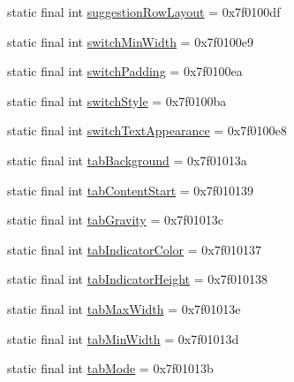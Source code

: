 \begin{CompactItemize}
\item 
static final int \hyperlink{classandroid_1_1support_1_1graphics_1_1drawable_1_1_r_1_1attr_e8e10574116be9e11c358d75ff323616}{suggestionRowLayout} = 0x7f0100df
\item 
static final int \hyperlink{classandroid_1_1support_1_1graphics_1_1drawable_1_1_r_1_1attr_4d688b83a54083a8d9114d1f82b1dbf5}{switchMinWidth} = 0x7f0100e9
\item 
static final int \hyperlink{classandroid_1_1support_1_1graphics_1_1drawable_1_1_r_1_1attr_95b3b0970d23cb3b858bcc2ffb09e4b3}{switchPadding} = 0x7f0100ea
\item 
static final int \hyperlink{classandroid_1_1support_1_1graphics_1_1drawable_1_1_r_1_1attr_26427559541fedf28887bd4ad5db9251}{switchStyle} = 0x7f0100ba
\item 
static final int \hyperlink{classandroid_1_1support_1_1graphics_1_1drawable_1_1_r_1_1attr_3e19347e909fce137f90b900a47db270}{switchTextAppearance} = 0x7f0100e8
\item 
static final int \hyperlink{classandroid_1_1support_1_1graphics_1_1drawable_1_1_r_1_1attr_31dbd3283763b84669acd3cf07072cd7}{tabBackground} = 0x7f01013a
\item 
static final int \hyperlink{classandroid_1_1support_1_1graphics_1_1drawable_1_1_r_1_1attr_2b1dfda823425a2525ccbf51a3cddaa8}{tabContentStart} = 0x7f010139
\item 
static final int \hyperlink{classandroid_1_1support_1_1graphics_1_1drawable_1_1_r_1_1attr_053a2902102ae41a288d60b9afb56ed3}{tabGravity} = 0x7f01013c
\item 
static final int \hyperlink{classandroid_1_1support_1_1graphics_1_1drawable_1_1_r_1_1attr_7a34b35bb03e0fda91267d9c093db679}{tabIndicatorColor} = 0x7f010137
\item 
static final int \hyperlink{classandroid_1_1support_1_1graphics_1_1drawable_1_1_r_1_1attr_34901eedf01bbdb2df0c26af32c8b3f1}{tabIndicatorHeight} = 0x7f010138
\item 
static final int \hyperlink{classandroid_1_1support_1_1graphics_1_1drawable_1_1_r_1_1attr_9dd293e2ce5286f0e0eb6de6151a594e}{tabMaxWidth} = 0x7f01013e
\item 
static final int \hyperlink{classandroid_1_1support_1_1graphics_1_1drawable_1_1_r_1_1attr_1d735bc6773e8f6fea31495a5588fe2e}{tabMinWidth} = 0x7f01013d
\item 
static final int \hyperlink{classandroid_1_1support_1_1graphics_1_1drawable_1_1_r_1_1attr_ea1627caa1d4697d55aed790602e40f7}{tabMode} = 0x7f01013b
\item 

\end{CompactItemize}
